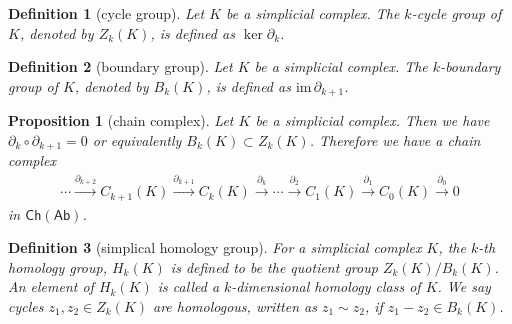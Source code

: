 \documentclass{report}
\newtheorem{definition}{Definition}[section]
\newtheorem{proposition}{Proposition}[section]
\theoremstyle{nonumberplain}
\begin{document}
\begin{definition}[cycle group]
	Let $K$ be a simplicial complex. The $k$-cycle group of $K$, denoted by $Z_k(K)$,  is defined as $\ker\partial_k$.
\end{definition}

\begin{definition}[boundary group]
	Let $K$ be a simplicial complex. The $k$-boundary group of $K$, denoted by $B_k(K)$, is defined as $\mathrm{im}\,\partial_{k+1}$.
\end{definition}

\begin{proposition}[chain complex]
	Let $K$ be a simplicial complex. Then we have $\partial_k\circ\partial_{k+1}=0$ or equivalently $B_k(K)\subset Z_k(K)$. Therefore we have a chain complex 
	\begin{align*}
		\cdots\stackrel{\partial_{k+2}}{\longrightarrow}  C_{k+1}(K)\stackrel{\partial_{k+1}}{\longrightarrow} C_{k}(K)\stackrel{\partial_{k}}{\longrightarrow} \cdots\stackrel{\partial_{2}}{\longrightarrow}  C_1(K)\stackrel{\partial_{1}}{\longrightarrow} C_0(K)\stackrel{\partial_{0}}{\longrightarrow}  0
	\end{align*}
	in $\mathsf{Ch}(\mathsf{Ab})$. 
\end{proposition}

\begin{definition}[simplical homology group]
	For a simplicial complex $K$, the $k$-th homology group, $H_k(K)$ is defined to be the quotient group $Z_k(K) / B_k(K)$. An element of $H_k(K)$ is called a $k$-dimensional homology class of $K$. We say cycles $z_1, z_2\in Z_k(K)$ are homologous, written as $z_1\sim z_2$, if $z_1-z_2 \in B_k(K)$. 
\end{definition}
\end{document}
